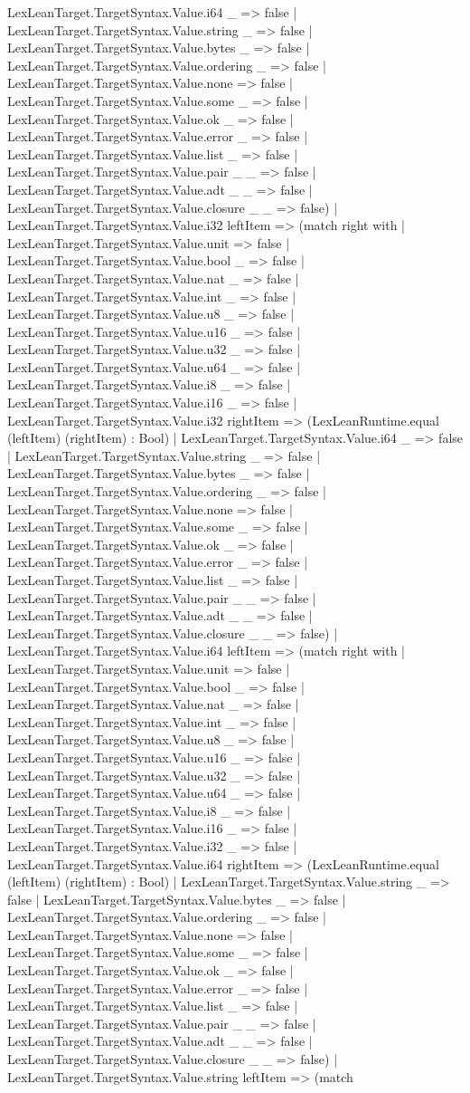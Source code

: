 \documentclass[11pt]{article}
\begin{document}
LexLeanTarget.TargetSyntax.Value.i64 \_ => false | LexLeanTarget.TargetSyntax.Value.string \_ => false | LexLeanTarget.TargetSyntax.Value.bytes \_ => false | LexLeanTarget.TargetSyntax.Value.ordering \_ => false | LexLeanTarget.TargetSyntax.Value.none => false | LexLeanTarget.TargetSyntax.Value.some \_ => false | LexLeanTarget.TargetSyntax.Value.ok \_ => false | LexLeanTarget.TargetSyntax.Value.error \_ => false | LexLeanTarget.TargetSyntax.Value.list \_ => false | LexLeanTarget.TargetSyntax.Value.pair \_ \_ => false | LexLeanTarget.TargetSyntax.Value.adt \_ \_ => false | LexLeanTarget.TargetSyntax.Value.closure \_ \_ => false) | LexLeanTarget.TargetSyntax.Value.i32 leftItem => (match right with | LexLeanTarget.TargetSyntax.Value.unit => false | LexLeanTarget.TargetSyntax.Value.bool \_ => false | LexLeanTarget.TargetSyntax.Value.nat \_ => false | LexLeanTarget.TargetSyntax.Value.int \_ => false | LexLeanTarget.TargetSyntax.Value.u8 \_ => false | LexLeanTarget.TargetSyntax.Value.u16 \_ => false | LexLeanTarget.TargetSyntax.Value.u32 \_ => false | LexLeanTarget.TargetSyntax.Value.u64 \_ => false | LexLeanTarget.TargetSyntax.Value.i8 \_ => false | LexLeanTarget.TargetSyntax.Value.i16 \_ => false | LexLeanTarget.TargetSyntax.Value.i32 rightItem => (LexLeanRuntime.equal (leftItem) (rightItem) : Bool) | LexLeanTarget.TargetSyntax.Value.i64 \_ => false | LexLeanTarget.TargetSyntax.Value.string \_ => false | LexLeanTarget.TargetSyntax.Value.bytes \_ => false | LexLeanTarget.TargetSyntax.Value.ordering \_ => false | LexLeanTarget.TargetSyntax.Value.none => false | LexLeanTarget.TargetSyntax.Value.some \_ => false | LexLeanTarget.TargetSyntax.Value.ok \_ => false | LexLeanTarget.TargetSyntax.Value.error \_ => false | LexLeanTarget.TargetSyntax.Value.list \_ => false | LexLeanTarget.TargetSyntax.Value.pair \_ \_ => false | LexLeanTarget.TargetSyntax.Value.adt \_ \_ => false | LexLeanTarget.TargetSyntax.Value.closure \_ \_ => false) | LexLeanTarget.TargetSyntax.Value.i64 leftItem => (match right with | LexLeanTarget.TargetSyntax.Value.unit => false | LexLeanTarget.TargetSyntax.Value.bool \_ => false | LexLeanTarget.TargetSyntax.Value.nat \_ => false | LexLeanTarget.TargetSyntax.Value.int \_ => false | LexLeanTarget.TargetSyntax.Value.u8 \_ => false | LexLeanTarget.TargetSyntax.Value.u16 \_ => false | LexLeanTarget.TargetSyntax.Value.u32 \_ => false | LexLeanTarget.TargetSyntax.Value.u64 \_ => false | LexLeanTarget.TargetSyntax.Value.i8 \_ => false | LexLeanTarget.TargetSyntax.Value.i16 \_ => false | LexLeanTarget.TargetSyntax.Value.i32 \_ => false | LexLeanTarget.TargetSyntax.Value.i64 rightItem => (LexLeanRuntime.equal (leftItem) (rightItem) : Bool) | LexLeanTarget.TargetSyntax.Value.string \_ => false | LexLeanTarget.TargetSyntax.Value.bytes \_ => false | LexLeanTarget.TargetSyntax.Value.ordering \_ => false | LexLeanTarget.TargetSyntax.Value.none => false | LexLeanTarget.TargetSyntax.Value.some \_ => false | LexLeanTarget.TargetSyntax.Value.ok \_ => false | LexLeanTarget.TargetSyntax.Value.error \_ => false | LexLeanTarget.TargetSyntax.Value.list \_ => false | LexLeanTarget.TargetSyntax.Value.pair \_ \_ => false | LexLeanTarget.TargetSyntax.Value.adt \_ \_ => false | LexLeanTarget.TargetSyntax.Value.closure \_ \_ => false) | LexLeanTarget.TargetSyntax.Value.string leftItem => (match 
\end{document}
